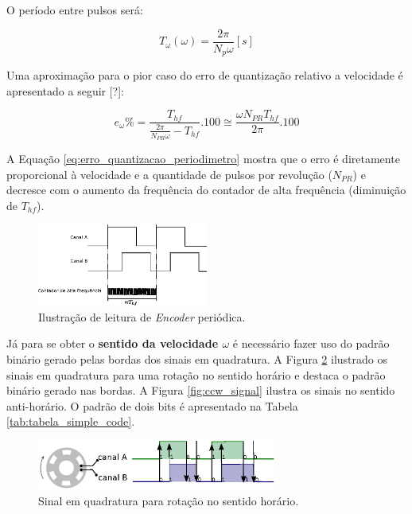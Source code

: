O período entre pulsos será:

\begin{equation}
    T_{\omega}(\omega) = \frac{2\pi}{N_{p}\omega} [s]
\end{equation}

Uma aproximação para o pior caso do erro de quantização relativo a velocidade é apresentado a seguir [?]:

\begin{equation}
    e_{\omega}\% = \frac{T_{hf}}{ \frac{2\pi}{N_{PR} \omega} - T_{hf} }.100 \cong \frac{\omega N_{PR} T_{hf}}{2\pi}.100
    \label{eq:erro_quantizacao_periodimetro}
\end{equation}

A Equação \ref{eq:erro_quantizacao_periodimetro} mostra que o erro é diretamente proporcional à velocidade e a quantidade de pulsos por revolução ($N_{PR}$) e decresce com o aumento da frequência do contador de alta frequência (diminuição de $T_{hf}$).


\begin{figure}[H]
    \centering
    \includegraphics[width=0.5\textwidth]{imagens/ilustracoes/ilustracao_medicao_encoder_por_periodo.eps}
    \caption{Ilustração de leitura de \emph{Encoder} periódica.}
    \label{fig:ilustracao_periodimetro}
\end{figure}

Já para se obter o \textbf{sentido da velocidade $\omega$} é necessário fazer uso do padrão binário gerado pelas bordas dos sinais em quadratura. A Figura \ref{fig:cw_signal} ilustrado os sinais em quadratura para uma rotação no sentido horário e destaca o padrão binário gerado nas bordas. A Figura \ref{fig:ccw_signal} ilustra os sinais no sentido anti-horário. O padrão de dois bits é apresentado na Tabela \ref{tab:tabela_simple_code}. \\

\begin{figure}[H]
    \centering
    \includegraphics[width=0.7\textwidth]{imagens/ilustracoes/sinal_enquadratura_sentido_CW.eps}
    \caption{Sinal em quadratura para rotação no sentido horário.}
    \label{fig:cw_signal}
\end{figure}

